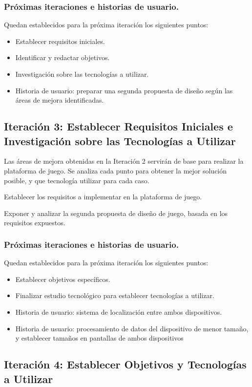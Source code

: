 \subsubsection{Próximas iteraciones e historias de usuario.}
Quedan establecidos para la próxima iteración los siguientes puntos:
\begin{itemize}
\item Establecer requisitos iniciales.
\item Identificar y redactar objetivos.
\item Investigación sobre las tecnologías a utilizar.
\item Historia de usuario: preparar una segunda propuesta de diseño según las áreas de mejora identificadas.
\end{itemize}


\subsection{Iteración 3: Establecer Requisitos Iniciales e Investigación sobre las Tecnologías a Utilizar}

Las áreas de mejora obtenidas en la Iteración 2 servirán de base para realizar la plataforma de juego. Se analiza cada punto para obtener la mejor solución posible, y que tecnología utilizar para cada caso.\

Establecer los requisitos a implementar en la plataforma de juego.

Exponer y analizar la segunda propuesta de diseño de juego, basada en los requisitos expuestos.


\subsubsection{Próximas iteraciones e historias de usuario.}
Quedan establecidos para la próxima iteración los siguientes puntos:
\begin{itemize}
\item Establecer objetivos específicos.
\item Finalizar estudio tecnológico para establecer tecnologías a utilizar.
\item Historia de usuario: sistema de localización entre ambos dispositivos.
\item Historia de usuario: procesamiento de datos del dispositivo de menor tamaño, y establecer tamaños en pantallas de ambos dispositivos
\end{itemize}

\subsection{Iteración 4: Establecer Objetivos y Tecnologías a Utilizar}

